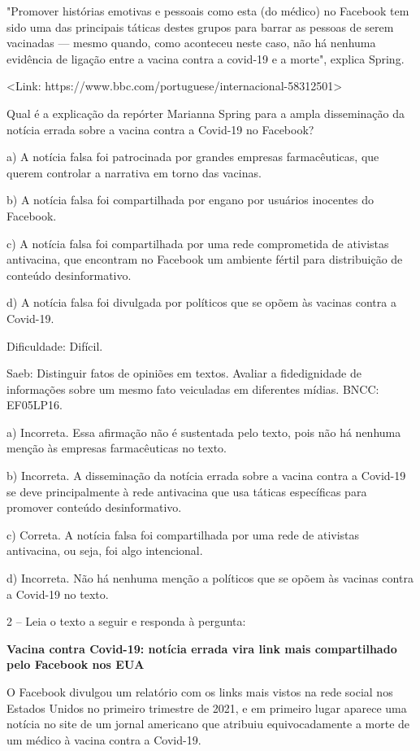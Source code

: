 "Promover histórias emotivas e pessoais como esta (do médico) no
Facebook tem sido uma das principais táticas destes grupos para barrar
as pessoas de serem vacinadas --- mesmo quando, como aconteceu neste
caso, não há nenhuma evidência de ligação entre a vacina contra a
covid-19 e a morte", explica Spring.

\textless{}Link:
https://www.bbc.com/portuguese/internacional-58312501\textgreater{}

Qual é a explicação da repórter Marianna Spring para a ampla
disseminação da notícia errada sobre a vacina contra a Covid-19 no
Facebook?

a) A notícia falsa foi patrocinada por grandes empresas farmacêuticas,
que querem controlar a narrativa em torno das vacinas.

b) A notícia falsa foi compartilhada por engano por usuários inocentes
do Facebook.

c) A notícia falsa foi compartilhada por uma rede comprometida de
ativistas antivacina, que encontram no Facebook um ambiente fértil para
distribuição de conteúdo desinformativo.

d) A notícia falsa foi divulgada por políticos que se opõem às vacinas
contra a Covid-19.

Dificuldade: Difícil.

Saeb: Distinguir fatos de opiniões em textos. Avaliar a fidedignidade de
informações sobre um mesmo fato veiculadas em diferentes mídias. BNCC:
EF05LP16.

a) Incorreta. Essa afirmação não é sustentada pelo texto, pois não há
nenhuma menção às empresas farmacêuticas no texto.

b) Incorreta. A disseminação da notícia errada sobre a vacina contra a
Covid-19 se deve principalmente à rede antivacina que usa táticas
específicas para promover conteúdo desinformativo.

c) Correta. A notícia falsa foi compartilhada por uma rede de ativistas
antivacina, ou seja, foi algo intencional.

d) Incorreta. Não há nenhuma menção a políticos que se opõem às vacinas
contra a Covid-19 no texto.

2 -- Leia o texto a seguir e responda à pergunta:

\textbf{Vacina contra Covid-19: notícia errada vira link mais
compartilhado pelo Facebook nos EUA}

O Facebook divulgou um relatório com os links mais vistos na rede social
nos Estados Unidos no primeiro trimestre de 2021, e em primeiro lugar
aparece uma notícia no site de um jornal americano que atribuiu
equivocadamente a morte de um médico à vacina contra a Covid-19.

